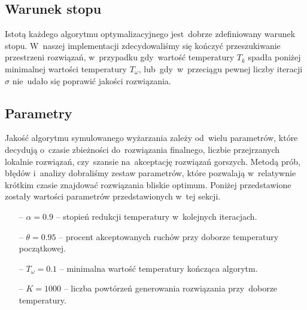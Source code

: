 \subsection{Warunek stopu}
Istotą każdego algorytmu optymalizacyjnego jest~dobrze zdefiniowany warunek stopu. W~naszej implementacji zdecydowaliśmy się kończyć przeszukiwanie przestrzeni rozwiązań, w~przypadku gdy~wartość temperatury $T_k$ spadła poniżej minimalnej wartości temperatury $T_\omega$, lub~gdy~w~przeciągu pewnej liczby iteracji $\sigma$ nie~udało się poprawić jakości rozwiązania. 


\subsection{Parametry}
Jakość algorytmu symulowanego wyżarzania zależy od~wielu parametrów, które decydują o~czasie zbieżności do~rozwiązania finalnego, liczbie przejrzanych lokalnie rozwiązań, czy~szansie na~akceptację rozwiązań gorszych. Metodą prób, błędów i~analizy dobraliśmy zestaw parametrów, które pozwalają w~relatywnie krótkim czasie znajdować rozwiązania bliskie optimum. Poniżej przedstawione zostały wartości parametrów przedstawionych w~tej sekcji.

\begin{itemize}
	\item[--] $\alpha = 0.9$ -- stopień redukcji temperatury w~kolejnych iteracjach.
	\item[--] $\theta = 0.95$ -- procent akceptowanych ruchów przy doborze temperatury początkowej.
	\item[--] $T_\omega = 0.1$ -- minimalna wartość temperatury kończąca algorytm.
	\item[--] $K = 1000$ -- liczba powtórzeń generowania rozwiązania przy~doborze temperatury.
\end{itemize}




